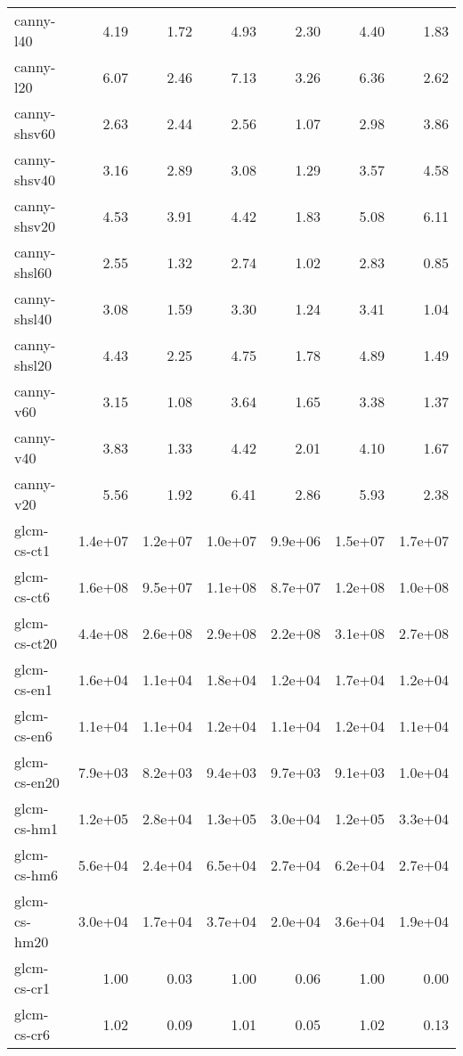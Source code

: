 \begin{tabular}{lrrrrrr}
canny-l40           &    4.19 &    1.72 &    4.93 &    2.30 &    4.40 &    1.83 \\
canny-l20           &    6.07 &    2.46 &    7.13 &    3.26 &    6.36 &    2.62 \\
canny-shsv60        &    2.63 &    2.44 &    2.56 &    1.07 &    2.98 &    3.86 \\
canny-shsv40        &    3.16 &    2.89 &    3.08 &    1.29 &    3.57 &    4.58 \\
canny-shsv20        &    4.53 &    3.91 &    4.42 &    1.83 &    5.08 &    6.11 \\
canny-shsl60        &    2.55 &    1.32 &    2.74 &    1.02 &    2.83 &    0.85 \\
canny-shsl40        &    3.08 &    1.59 &    3.30 &    1.24 &    3.41 &    1.04 \\
canny-shsl20        &    4.43 &    2.25 &    4.75 &    1.78 &    4.89 &    1.49 \\
canny-v60           &    3.15 &    1.08 &    3.64 &    1.65 &    3.38 &    1.37 \\
canny-v40           &    3.83 &    1.33 &    4.42 &    2.01 &    4.10 &    1.67 \\
canny-v20           &    5.56 &    1.92 &    6.41 &    2.86 &    5.93 &    2.38 \\
glcm-cs-ct1         & 1.4e+07 & 1.2e+07 & 1.0e+07 & 9.9e+06 & 1.5e+07 & 1.7e+07 \\
glcm-cs-ct6         & 1.6e+08 & 9.5e+07 & 1.1e+08 & 8.7e+07 & 1.2e+08 & 1.0e+08 \\
glcm-cs-ct20        & 4.4e+08 & 2.6e+08 & 2.9e+08 & 2.2e+08 & 3.1e+08 & 2.7e+08 \\
glcm-cs-en1         & 1.6e+04 & 1.1e+04 & 1.8e+04 & 1.2e+04 & 1.7e+04 & 1.2e+04 \\
glcm-cs-en6         & 1.1e+04 & 1.1e+04 & 1.2e+04 & 1.1e+04 & 1.2e+04 & 1.1e+04 \\
glcm-cs-en20        & 7.9e+03 & 8.2e+03 & 9.4e+03 & 9.7e+03 & 9.1e+03 & 1.0e+04 \\
glcm-cs-hm1         & 1.2e+05 & 2.8e+04 & 1.3e+05 & 3.0e+04 & 1.2e+05 & 3.3e+04 \\
glcm-cs-hm6         & 5.6e+04 & 2.4e+04 & 6.5e+04 & 2.7e+04 & 6.2e+04 & 2.7e+04 \\
glcm-cs-hm20        & 3.0e+04 & 1.7e+04 & 3.7e+04 & 2.0e+04 & 3.6e+04 & 1.9e+04 \\
glcm-cs-cr1         &    1.00 &    0.03 &    1.00 &    0.06 &    1.00 &    0.00 \\
glcm-cs-cr6         &    1.02 &    0.09 &    1.01 &    0.05 &    1.02 &    0.13 \\

\end{tabular}
